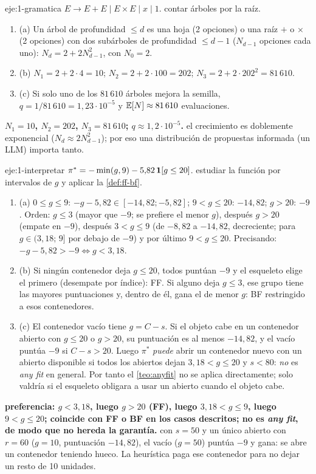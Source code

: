 \begin{solucion}{eje:1-gramatica}
\datos $E\to E+E\mid E\times E\mid x\mid 1$.
\planteamiento contar árboles por la raíz.
\pasos
\begin{enumerate}[label=\arabic*.]
  \item (a) Un árbol de profundidad $\le d$ es una hoja (2 opciones) o una raíz $+$ o $\times$ (2 opciones) con dos subárboles de profundidad $\le d-1$ ($N_{d-1}$ opciones cada uno): $N_d=2+2N_{d-1}^{2}$, con $N_0=2$.
  \item (b) $N_1=2+2\cdot4=10$; $N_2=2+2\cdot100=202$; $N_3=2+2\cdot202^{2}=81\,610$.
  \item (c) Si solo uno de los $81\,610$ árboles mejora la semilla, $q=1/81\,610=1{,}23\cdot10^{-5}$ y $\mathbb{E}[N]\approx81\,610$ evaluaciones.
\end{enumerate}
\resultado \textbf{$N_1=10$, $N_2=202$, $N_3=81\,610$; $q\approx1{,}2\cdot10^{-5}$.}
\comprobacion el crecimiento es doblemente exponencial ($N_d\approx 2N_{d-1}^{2}$); por eso una distribución de propuestas informada (un LLM) importa tanto.
\end{solucion}

\begin{solucion}{eje:1-interpretar}
\datos $\pi^{*}=-\min(g,9)-5{,}82\,\mathbf{1}[g\le20]$.
\planteamiento estudiar la función por intervalos de $g$ y aplicar la \cref{def:ff-bf}.
\pasos
\begin{enumerate}[label=\arabic*.]
  \item (a) $0\le g\le9$: $-g-5{,}82\in[-14{,}82;-5{,}82]$; $9<g\le20$: $-14{,}82$; $g>20$: $-9$. Orden: $g\le3$ (mayor que $-9$; se prefiere el menor $g$), después $g>20$ (empate en $-9$), después $3<g\le9$ (de $-8{,}82$ a $-14{,}82$, decreciente; para $g\in(3{,}18;\,9]$ por debajo de $-9$) y por último $9<g\le20$. Precisando: $-g-5{,}82>-9\iff g<3{,}18$.
  \item (b) Si ningún contenedor deja $g\le20$, todos puntúan $-9$ y el esqueleto elige el primero (desempate por índice): FF. Si alguno deja $g\le3$, ese grupo tiene las mayores puntuaciones y, dentro de él, gana el de menor $g$: BF restringido a esos contenedores.
  \item (c) El contenedor vacío tiene $g=C-s$. Si el objeto cabe en un contenedor abierto con $g\le 20$ o $g>20$, su puntuación es al menos $-14{,}82$, y el vacío puntúa $-9$ si $C-s>20$. Luego $\pi^{*}$ \emph{puede} abrir un contenedor nuevo con un abierto disponible si todos los abiertos dejan $3{,}18<g\le20$ y $s<80$: \emph{no} es \emph{any fit} en general. Por tanto el \cref{teo:anyfit} no se aplica directamente; solo valdría si el esqueleto obligara a usar un abierto cuando el objeto cabe.
\end{enumerate}
\resultado \textbf{preferencia: $g<3{,}18$, luego $g>20$ (FF), luego $3{,}18<g\le9$, luego $9<g\le20$; coincide con FF o BF en los casos descritos; no es \emph{any fit}, de modo que no hereda la garantía.}
\comprobacion con $s=50$ y un único abierto con $r=60$ ($g=10$, puntuación $-14{,}82$), el vacío ($g=50$) puntúa $-9$ y gana: se abre un contenedor teniendo hueco. La heurística paga ese contenedor para no dejar un resto de 10 unidades.
\end{solucion}

